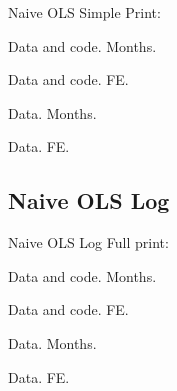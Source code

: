 \documentclass{beamer}
\begin{document}
\begin{frame}{}
\scalebox{0.5}{}
\end{frame}

\begin{frame}{}
\scalebox{0.5}{}
\end{frame}

\begin{frame}{}
\scalebox{0.5}{}
\end{frame}

\begin{frame}{}
\scalebox{0.5}{}
\end{frame}

\begin{frame}{Naive OLS}
Simple Print:

Data and code. Months.

Data and code. FE.

Data. Months.

Data. FE.
\end{frame}

\begin{frame}{}
\scalebox{0.65}{}
\end{frame}

\begin{frame}{}
\scalebox{0.65}{}
\end{frame}

\begin{frame}{}
\scalebox{0.65}{}
\end{frame}

\begin{frame}{}
\scalebox{0.65}{}
\end{frame}

\subsection{Naive OLS Log}
\begin{frame}{Naive OLS Log}
Full print:

Data and code. Months.

Data and code. FE.

Data. Months.

Data. FE.
\end{frame}
\end{document}
